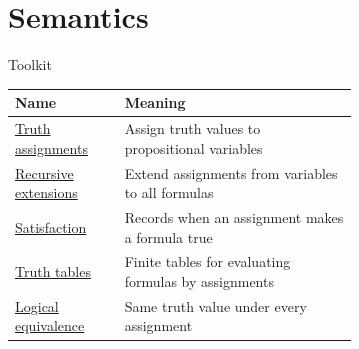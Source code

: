 \section{Semantics}

\begin{toolkitbox}{Toolkit}
\small
\begin{tabular}{l p{0.68\linewidth}}
\toprule
\textbf{Name} & \textbf{Meaning} \\
\midrule
\hyperref[def:truth-assignment-propositional-logic]{Truth assignments} & Assign truth values to propositional variables \\
\hyperref[def:extended-truth-assignment-propositional-logic]{Recursive extensions} & Extend assignments from variables to all formulas \\
\hyperref[def:satisfaction-propositional-formula]{Satisfaction} & Records when an assignment makes a formula true \\
\hyperref[def:truth-table-propositional-logic]{Truth tables} & Finite tables for evaluating formulas by assignments \\
\hyperref[def:logical-equivalence-propositional-logic]{Logical equivalence} & Same truth value under every assignment \\
\bottomrule
\end{tabular}
\end{toolkitbox}




